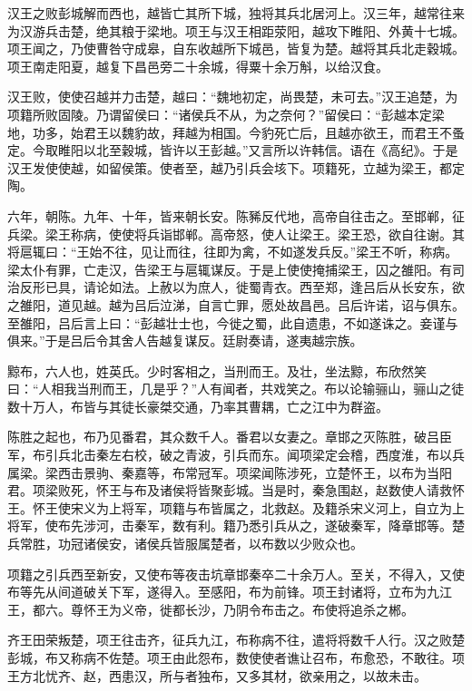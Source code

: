 \documentclass[12pt,UTF8]{ctexbook}
\begin{document}
汉王之败彭城解而西也，越皆亡其所下城，独将其兵北居河上。汉三年，越常往来为汉游兵击楚，绝其粮于梁地。项王与汉王相距荥阳，越攻下睢阳、外黄十七城。项王闻之，乃使曹咎守成皋，自东收越所下城邑，皆复为楚。越将其兵北走穀城。项王南走阳夏，越复下昌邑旁二十余城，得粟十余万斛，以给汉食。



汉王败，使使召越并力击楚，越曰：“魏地初定，尚畏楚，未可去。”汉王追楚，为项籍所败固陵。乃谓留侯曰：“诸侯兵不从，为之奈何？”留侯曰：“彭越本定梁地，功多，始君王以魏豹故，拜越为相国。今豹死亡后，且越亦欲王，而君王不蚤定。今取睢阳以北至穀城，皆许以王彭越。”又言所以许韩信。语在《高纪》。于是汉王发使使越，如留侯策。使者至，越乃引兵会垓下。项籍死，立越为梁王，都定陶。



六年，朝陈。九年、十年，皆来朝长安。陈豨反代地，高帝自往击之。至邯郸，征兵梁。梁王称病，使使将兵诣邯郸。高帝怒，使人让梁王。梁王恐，欲自往谢。其将扈辄曰：“王始不往，见让而往，往即为禽，不如遂发兵反。”梁王不听，称病。梁太仆有罪，亡走汉，告梁王与扈辄谋反。于是上使使掩捕梁王，囚之雒阳。有司治反形已具，请论如法。上赦以为庶人，徙蜀青衣。西至郑，逢吕后从长安东，欲之雒阳，道见越。越为吕后泣涕，自言亡罪，愿处故昌邑。吕后许诺，诏与俱东。至雒阳，吕后言上曰：“彭越壮士也，今徙之蜀，此自遗患，不如遂诛之。妾谨与俱来。”于是吕后令其舍人告越复谋反。廷尉奏请，遂夷越宗族。



黥布，六人也，姓英氏。少时客相之，当刑而王。及壮，坐法黥，布欣然笑曰：“人相我当刑而王，几是乎？”人有闻者，共戏笑之。布以论输骊山，骊山之徒数十万人，布皆与其徒长豪桀交通，乃率其曹耦，亡之江中为群盗。



陈胜之起也，布乃见番君，其众数千人。番君以女妻之。章邯之灭陈胜，破吕臣军，布引兵北击秦左右校，破之青波，引兵而东。闻项梁定会稽，西度淮，布以兵属梁。梁西击景驹、秦嘉等，布常冠军。项梁闻陈涉死，立楚怀王，以布为当阳君。项梁败死，怀王与布及诸侯将皆聚彭城。当是时，秦急围赵，赵数使人请救怀王。怀王使宋义为上将军，项籍与布皆属之，北救赵。及籍杀宋义河上，自立为上将军，使布先涉河，击秦军，数有利。籍乃悉引兵从之，遂破秦军，降章邯等。楚兵常胜，功冠诸侯安，诸侯兵皆服属楚者，以布数以少败众也。



项籍之引兵西至新安，又使布等夜击坑章邯秦卒二十余万人。至关，不得入，又使布等先从间道破关下军，遂得入。至感阳，布为前锋。项王封诸将，立布为九江王，都六。尊怀王为义帝，徙都长沙，乃阴令布击之。布使将追杀之郴。



齐王田荣叛楚，项王往击齐，征兵九江，布称病不往，遣将将数千人行。汉之败楚彭城，布又称病不佐楚。项王由此怨布，数使使者谯让召布，布愈恐，不敢往。项王方北忧齐、赵，西患汉，所与者独布，又多其材，欲亲用之，以故未击。
\end{document}
